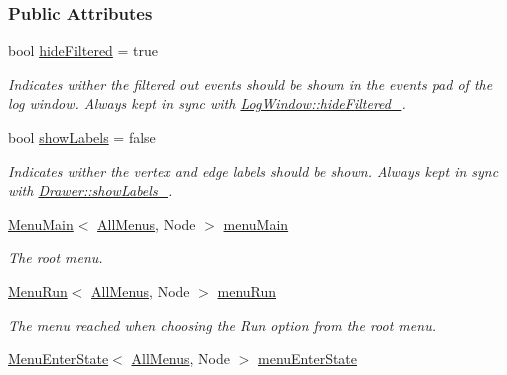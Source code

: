 \subsubsection*{Public Attributes}
\begin{DoxyCompactItemize}
\item 
bool \hyperlink{structAllMenus_a612b3829ee9824dd9e48dd8f506eafc4}{hide\+Filtered} = true\hypertarget{structAllMenus_a612b3829ee9824dd9e48dd8f506eafc4}{}\label{structAllMenus_a612b3829ee9824dd9e48dd8f506eafc4}

\begin{DoxyCompactList}\small\item\em Indicates wither the filtered out events should be shown in the events pad of the log window. Always kept in sync with \hyperlink{structLogWindow_a56d791526d401dfbaa9c582e535f3e90}{Log\+Window\+::hide\+Filtered\+\_\+}. \end{DoxyCompactList}\item 
bool \hyperlink{structAllMenus_a97e40a3fb93df25a85c1b8f4518dd079}{show\+Labels} = false\hypertarget{structAllMenus_a97e40a3fb93df25a85c1b8f4518dd079}{}\label{structAllMenus_a97e40a3fb93df25a85c1b8f4518dd079}

\begin{DoxyCompactList}\small\item\em Indicates wither the vertex and edge labels should be shown. Always kept in sync with \hyperlink{structDrawer_a9042fd2e9d4874e0ff4900ee8d97a6bf}{Drawer\+::show\+Labels\+\_\+}. \end{DoxyCompactList}\item 
\hyperlink{structMenuMain}{Menu\+Main}$<$ \hyperlink{structAllMenus}{All\+Menus}, Node $>$ \hyperlink{structAllMenus_a5061de2c0d5791b4e1bd843f53de43d6}{menu\+Main}\hypertarget{structAllMenus_a5061de2c0d5791b4e1bd843f53de43d6}{}\label{structAllMenus_a5061de2c0d5791b4e1bd843f53de43d6}

\begin{DoxyCompactList}\small\item\em The root menu. \end{DoxyCompactList}\item 
\hyperlink{structMenuRun}{Menu\+Run}$<$ \hyperlink{structAllMenus}{All\+Menus}, Node $>$ \hyperlink{structAllMenus_a13d82c597357731ab89d632721a01784}{menu\+Run}\hypertarget{structAllMenus_a13d82c597357731ab89d632721a01784}{}\label{structAllMenus_a13d82c597357731ab89d632721a01784}

\begin{DoxyCompactList}\small\item\em The menu reached when choosing the Run option from the root menu. \end{DoxyCompactList}\item 
\hyperlink{structMenuEnterState}{Menu\+Enter\+State}$<$ \hyperlink{structAllMenus}{All\+Menus}, Node $>$ \hyperlink{structAllMenus_afb009765aaf502a3ab3fdd5d151db952}{menu\+Enter\+State}\hypertarget{structAllMenus_afb009765aaf502a3ab3fdd5d151db952}{}\label{structAllMenus_afb009765aaf502a3ab3fdd5d151db952}


\end{DoxyCompactItemize}
